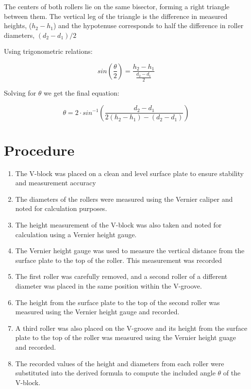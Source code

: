\documentclass[12pt]{article}
\begin{document}
The centers of both rollers lie on the same bisector, forming a right triangle between them. The vertical leg of the triangle is the difference in measured heights, ($h_2-h_1$) and the hypotenuse corresponds to half the difference in roller diameters, $(d_2-d_1)/2$

Using trigonometric relations:

$$
	sin \left(\frac{\theta}{2} \right) = \frac{h_2-h_1}{\frac{d_2-d_1}{2}}
$$

Solving for $\theta$ we get the final equation:

$$
	\theta = 2\cdot sin^{-1}\left(\frac{d_2-d_1}{2(h_2-h_1)-(d_2-d_1)} \right)
$$
\section{Procedure}

\begin{enumerate}
	\item The V-block was placed on a clean and level surface plate to ensure stability and measurement accuracy
	\item The diameters of the rollers were measured using the Vernier caliper and noted for calculation purposes.
	\item The height measurement of the V-block was also taken and noted for calculation using a Vernier height gauge.
	\item The Vernier height gauge was used to measure the vertical distance  from the surface plate to the top of the roller. This measurement was recorded
	\item The first roller was carefully removed, and a second roller of a different diameter was placed in the same position within the V-groove.
	\item The height from the surface plate to the top of the second roller was measured using the Vernier height gauge and recorded.
	\item A third roller was also placed on the V-groove and its height from the surface plate to the top of the roller was measured using the Vernier height guage and recorded.
	\item The recorded values of the height and diameters from each roller were substituted into the derived formula to compute the included angle $\theta$ of the V-block.

\end{enumerate}

\end{document}
